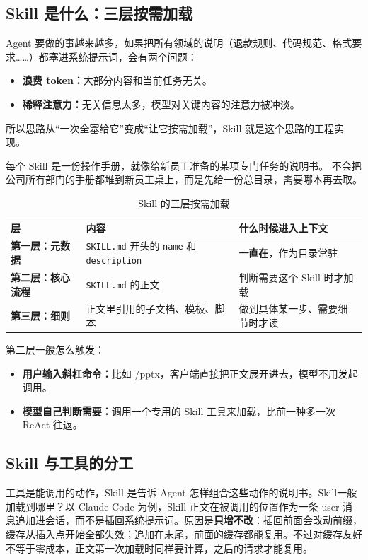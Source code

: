 \subsection{Skill 是什么：三层按需加载}
Agent 要做的事越来越多，如果把所有领域的说明（退款规则、代码规范、格式要求……）都塞进系统提示词，会有两个问题：
\begin{itemize}
  \item \textbf{浪费 token：}大部分内容和当前任务无关。
  \item \textbf{稀释注意力：}无关信息太多，模型对关键内容的注意力被冲淡。
\end{itemize}
所以思路从“一次全塞给它”变成“让它按需加载”，Skill 就是这个思路的工程实现。
\begin{definition}
   每个 Skill 是一份操作手册，就像给新员工准备的某项专门任务的说明书。 不会把公司所有部门的手册都堆到新员工桌上，而是先给一份总目录，需要哪本再去取。
\end{definition}
    \begin{table}[H]
\centering
\caption{Skill 的三层按需加载}
\label{tab:skill-layers}
\begin{tabular}{p{3.2cm} p{5.6cm} p{5.8cm}}
  \toprule
  层 & 内容 & 什么时候进入上下文 \\
  \midrule
  \textbf{第一层：元数据}   & \texttt{SKILL.md} 开头的 \texttt{name} 和 \texttt{description} & \textbf{一直在}，作为目录常驻 \\
  \addlinespace
  \textbf{第二层：核心流程} & \texttt{SKILL.md} 的正文 & 判断需要这个 Skill 时才加载 \\
  \addlinespace
  \textbf{第三层：细则}     & 正文里引用的子文档、模板、脚本 & 做到具体某一步、需要细节时才读 \\
  \bottomrule
\end{tabular}
\end{table}
第二层一般怎么触发：
\begin{itemize}
  \item \textbf{用户输入斜杠命令：}比如 /pptx，客户端直接把正文展开进去，模型不用发起调用。
  \item \textbf{模型自己判断需要：}调用一个专用的 Skill 工具来加载，比前一种多一次 ReAct 往返。
\end{itemize}
\subsection{Skill 与工具的分工}

工具是能调用的动作，Skill 是告诉 Agent 怎样组合这些动作的说明书。Skill一般加载到哪里？以 Claude Code 为例，Skill 正文在被调用的位置作为一条 user 消息追加进会话，而不是插回系统提示词。原因是\textbf{只增不改}：插回前面会改动前缀，缓存从插入点开始全部失效；追加在末尾，前面的缓存都能复用。不过对缓存友好不等于零成本，正文第一次加载时同样要计算，之后的请求才能复用。

